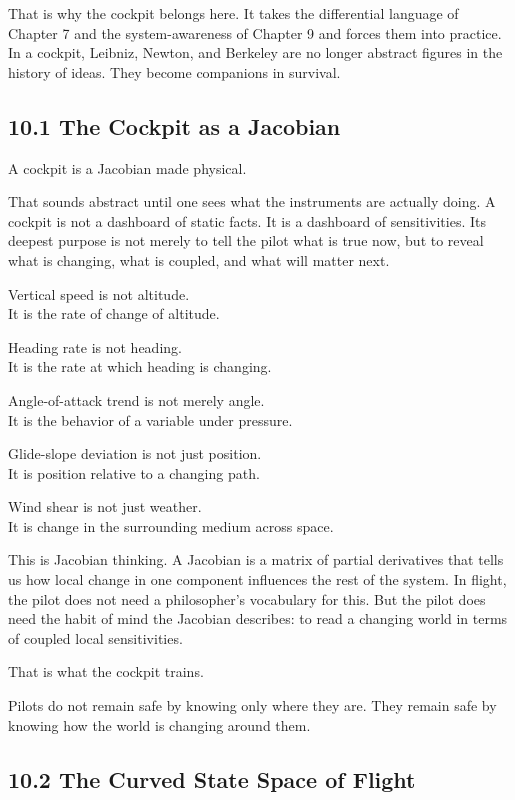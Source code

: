 \documentclass[
]{article}
\begin{document}
That is why the cockpit belongs here. It takes the differential language
of Chapter 7 and the system-awareness of Chapter 9 and forces them into
practice. In a cockpit, Leibniz, Newton, and Berkeley are no longer
abstract figures in the history of ideas. They become companions in
survival.

\hypertarget{the-cockpit-as-a-jacobian}{%
\subsection{10.1 The Cockpit as a
Jacobian}\label{the-cockpit-as-a-jacobian}}

A cockpit is a Jacobian made physical.

That sounds abstract until one sees what the instruments are actually
doing. A cockpit is not a dashboard of static facts. It is a dashboard
of sensitivities. Its deepest purpose is not merely to tell the pilot
what is true now, but to reveal what is changing, what is coupled, and
what will matter next.

Vertical speed is not altitude.\\
It is the rate of change of altitude.

Heading rate is not heading.\\
It is the rate at which heading is changing.

Angle-of-attack trend is not merely angle.\\
It is the behavior of a variable under pressure.

Glide-slope deviation is not just position.\\
It is position relative to a changing path.

Wind shear is not just weather.\\
It is change in the surrounding medium across space.

This is Jacobian thinking. A Jacobian is a matrix of partial derivatives
that tells us how local change in one component influences the rest of
the system. In flight, the pilot does not need a philosopher's
vocabulary for this. But the pilot does need the habit of mind the
Jacobian describes: to read a changing world in terms of coupled local
sensitivities.

That is what the cockpit trains.

Pilots do not remain safe by knowing only where they are. They remain
safe by knowing how the world is changing around them.

\hypertarget{the-curved-state-space-of-flight}{%
\subsection{10.2 The Curved State Space of
Flight}\label{the-curved-state-space-of-flight}}
\end{document}
